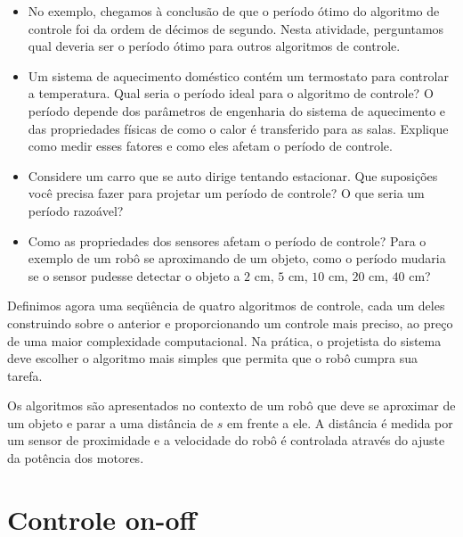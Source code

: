 \begin{framed}
\begin{itemize}
\item No exemplo, chegamos à conclusão de que o período ótimo do algoritmo de controle foi da ordem de décimos de segundo. Nesta atividade, perguntamos qual deveria ser o período ótimo para outros algoritmos de controle.
\item Um sistema de aquecimento doméstico contém um termostato para controlar a temperatura. Qual seria o período ideal para o algoritmo de controle? O período depende dos parâmetros de engenharia do sistema de aquecimento e das propriedades físicas de como o calor é transferido para as salas. Explique como medir esses fatores e como eles afetam o período de controle.
\item Considere um carro que se auto dirige tentando estacionar. Que suposições você precisa fazer para projetar um período de controle? O que seria um período razoável?
\item Como as propriedades dos sensores afetam o período de controle? Para o exemplo de um robô se aproximando de um objeto, como o período mudaria se o sensor pudesse detectar o objeto a $2$ cm, $5$ cm, $10$ cm, $20$ cm, $40$ cm?
\end{itemize}
\end{framed}

Definimos agora uma seqüência de quatro algoritmos de controle, cada um deles construindo sobre o anterior e proporcionando um controle mais preciso, ao preço de uma maior complexidade computacional. Na prática, o projetista do sistema deve escolher o algoritmo mais simples que permita que o robô cumpra sua tarefa.

Os algoritmos são apresentados no contexto de um robô que deve se aproximar de um objeto e parar a uma distância de $s$ em frente a ele. A distância é medida por um sensor de proximidade e a velocidade do robô é controlada através do ajuste da potência dos motores.


\section{Controle on-off}\label{s.on-off}

